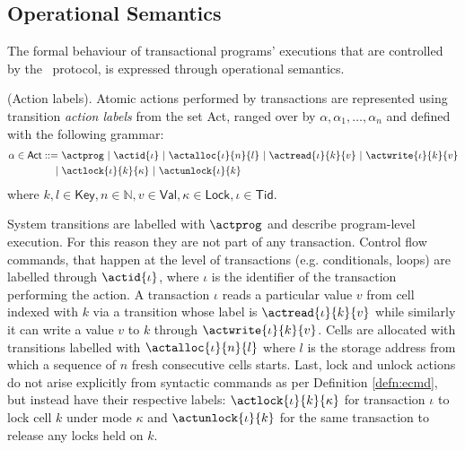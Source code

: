 \subsection{Operational Semantics}

The formal behaviour of transactional programs' executions that are controlled by the \tpl\ protocol, is expressed through operational semantics.

\begin{defn}
	(Action labels).
	Atomic actions performed by transactions are represented using transition \emph{action labels} from the set \textsf{Act}, ranged over by $\alpha, \alpha_1, \ldots, \alpha_n$ and defined with the following grammar:
	\begin{align*}
		\alpha \in \mathsf{Act} ::=
		\ &\actprog\
		|\ \actid{\iota}\
		|\ \actalloc{\iota}{n}{l}\
		|\ \actread{\iota}{k}{v}\
		|\ \actwrite{\iota}{k}{v}\\
		|\ &\actlock{\iota}{k}{\kappa}\
		|\ \actunlock{\iota}{k}
	\end{align*}
	where $k, l \in \mathsf{Key}, n \in \mathds{N}, v \in \mathsf{Val}, \kappa \in \mathsf{Lock}, \iota \in \mathsf{Tid}$.
\end{defn}

System transitions are labelled with $\actprog$ and describe program-level execution. For this reason they are not part of any transaction. Control flow commands, that happen at the level of transactions (e.g. conditionals, loops) are labelled through $\actid{\iota}$, where $\iota$ is the identifier of the transaction performing the action. A transaction $\iota$ reads a particular value $v$ from cell indexed with $k$ via a transition whose label is $\actread{\iota}{k}{v}$ while similarly it can write a value $v$ to $k$ through $\actwrite{\iota}{k}{v}$. Cells are allocated with transitions labelled with $\actalloc{\iota}{n}{l}$ where $l$ is the storage address from which a sequence of $n$ fresh consecutive cells starts. Last, lock and unlock actions do not arise explicitly from syntactic commands as per Definition \ref{defn:ecmd}, but instead have their respective labels: $\actlock{\iota}{k}{\kappa}$ for transaction $\iota$ to lock cell $k$ under mode $\kappa$ and $\actunlock{\iota}{k}$ for the same transaction to release any locks held on $k$.

